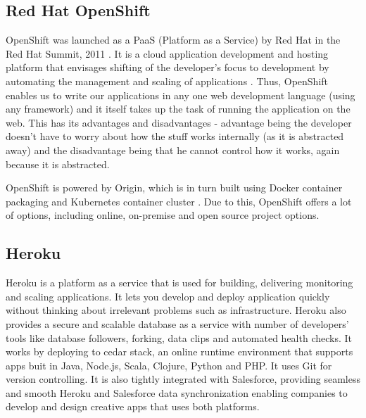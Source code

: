 \subsection{Red Hat OpenShift}

    OpenShift was launched as a PaaS (Platform as a
    Service) by Red Hat in the Red Hat Summit, 2011 \cite{www-paas-openshift}.
    It is a cloud application development and hosting platform that 
    envisages shifting of the developer's focus to development by 
    automating the management and scaling of applications 
    \cite{www-developers-openshift}.  Thus, OpenShift
    enables us to write our applications in any one web development
    language (using any framework) and it itself takes up the task of
    running the application on the web\cite{www-openshift}.
    This has its advantages and
    disadvantages - advantage being the developer doesn't have to
    worry about how the stuff works internally (as it is abstracted
    away) and the disadvantage being that he cannot control how it
    works, again because it is abstracted.

    OpenShift is powered by Origin, which is in turn built using 
    Docker container packaging and Kubernetes container cluster 
    \cite{www-openshift-blog}.  Due to this, OpenShift offers a lot of
    options, including online, on-premise and open source project
    options.

    \pv
    
\subsection{Heroku}

    Heroku is a platform as a service that is used
    for building, delivering monitoring and
    scaling applications\cite{www-Heroku}. It
    lets you develop and deploy application quickly without thinking
    about irrelevant problems such as infrastructure. Heroku also
    provides a secure and scalable database as a service with number
    of developers’ tools like database followers, forking, data clips
    and automated health checks. It works by deploying to cedar stack,
    an online runtime environment that supports apps buit in Java,
    Node.js, Scala, Clojure, Python and PHP\cite{www-cedar}. It
    uses Git for version controlling. It is also tightly integrated
    with Salesforce, providing seamless and smooth Heroku and
    Salesforce data synchronization enabling companies to develop and
    design creative apps that uses both platforms.

